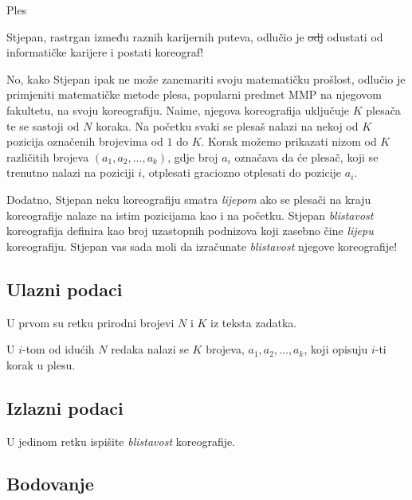 \begin{statement}[
  problempoints=100,
  timelimit=1 sekunda,
  memorylimit=512 MiB,
]{Ples}

Stjepan, rastrgan između raznih karijernih puteva, odlučio je \st{odj} odustati od informatičke karijere i postati koreograf!

No, kako Stjepan ipak ne može zanemariti svoju matematičku prošlost, odlučio je primjeniti matematičke metode plesa, popularni predmet MMP na njegovom fakultetu, na svoju koreografiju. Naime, njegova koreografija uključuje $K$ plesača te se sastoji od $N$ koraka. Na početku svaki se plesaš nalazi na nekoj od $K$ pozicija označenih brojevima od $1$ do $K$. Korak možemo prikazati nizom od $K$ različitih brojeva $(a_1, a_2, \ldots, a_k)$, gdje broj $a_i$ označava da će plesač, koji se trenutno nalazi na poziciji $i$, otplesati graciozno otplesati do pozicije $a_i$.

Dodatno, Stjepan neku koreografiju smatra \textit{lijepom} ako se plesači na kraju koreografije nalaze na istim pozicijama kao i na početku. Stjepan \textit{blistavost} koreografija definira kao broj uzastopnih podnizova koji zasebno čine \textit{lijepu} koreografiju. Stjepan vas sada moli da izračunate \textit{blistavost} njegove koreografije!

\subsection*{Ulazni podaci}

U prvom su retku prirodni brojevi $N$ i $K$ iz teksta zadatka.

U $i$-tom od idućih $N$ redaka nalazi se $K$ brojeva, $a_1, a_2, \ldots, a_k$, koji opisuju $i$-ti korak u plesu.

\subsection*{Izlazni podaci}

U jedinom retku ispišite \textit{blistavost} koreografije.

\subsection*{Bodovanje}


\end{statement}
